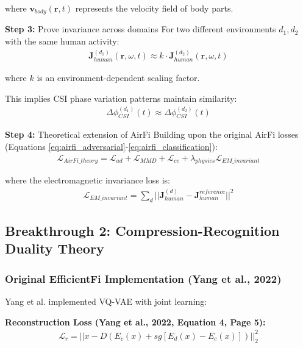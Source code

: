 \documentclass[12pt,a4paper]{article}
\begin{document}
where $\mathbf{v}_{body}(\mathbf{r},t)$ represents the velocity field of body parts.

\textbf{Step 3:} Prove invariance across domains
For two different environments $d_1, d_2$ with the same human activity:
\begin{align}
\mathbf{J}_{human}^{(d_1)}(\mathbf{r},\omega,t) \approx k \cdot \mathbf{J}_{human}^{(d_2)}(\mathbf{r},\omega,t) \label{eq:current_invariance}
\end{align}

where $k$ is an environment-dependent scaling factor.

This implies CSI phase variation patterns maintain similarity:
\begin{align}
\Delta\phi_{CSI}^{(d_1)}(t) \approx \Delta\phi_{CSI}^{(d_2)}(t) \label{eq:phase_invariance}
\end{align}

\textbf{Step 4:} Theoretical extension of AirFi
Building upon the original AirFi losses (Equations \ref{eq:airfi_adversarial}-\ref{eq:airfi_classification}):
\begin{align}
\mathcal{L}_{AirFi\_theory} = \mathcal{L}_{ad} + \mathcal{L}_{MMD} + \mathcal{L}_{ce} + \lambda_{physics} \mathcal{L}_{EM\_invariant} \label{eq:airfi_theory_extended}
\end{align}

where the electromagnetic invariance loss is:
\begin{align}
\mathcal{L}_{EM\_invariant} = \sum_{d} ||\mathbf{J}_{human}^{(d)} - \mathbf{J}_{human}^{reference}||^2 \label{eq:em_invariant_loss}
\end{align}

\subsection{Breakthrough 2: Compression-Recognition Duality Theory}

\subsubsection{Original EfficientFi Implementation (Yang et al., 2022)}

Yang et al. \cite{yang2022efficientfi} implemented VQ-VAE with joint learning:

\textbf{Reconstruction Loss (Yang et al., 2022, Equation 4, Page 5):}
\begin{align}
\mathcal{L}_r = ||x - D(E_c(x) + sg[E_d(x) - E_c(x)])||_2^2 \label{eq:efficientfi_reconstruction}
\end{align}
\end{document}
